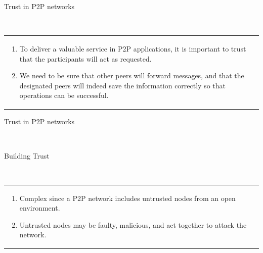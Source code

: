 \documentclass[12pt]{beamer}
\renewcommand{\frametitle}[1]{\vspace{0.2cm}\begin{huge}#1\end{huge}\\}
\renewcommand{\framesubtitle}[1]{\vspace{0.4cm} \hspace{0.4cm}\begin{large}#1\end{large}\\}
\begin{document}
  \begin{frame}
  \frametitle{Trust in P2P networks}
  \begin{table}
  \begin{tabular}{p{10cm}}
  \begin{enumerate}
      \item To deliver a valuable service in P2P applications, it
  is important to trust that the participants will act as requested.
      \item We need to be sure that other peers will forward
  messages, and that the designated peers will indeed save the information
  correctly so that operations can be successful.
  \end{enumerate}
  \end{tabular}
  \end{table}
  \end{frame}
  
  \begin{frame}
  \frametitle{Trust in P2P networks}
  \framesubtitle{Building Trust}
  \begin{table}
  \begin{tabular}{p{10cm}}
  \begin{enumerate}
      \item Complex since a P2P network includes untrusted nodes from an open environment.
      \item Untrusted nodes may be faulty, malicious, and act together to attack the network.
  \end{enumerate}
  \end{tabular}
  \end{table}
  \end{frame}
\end{document}
